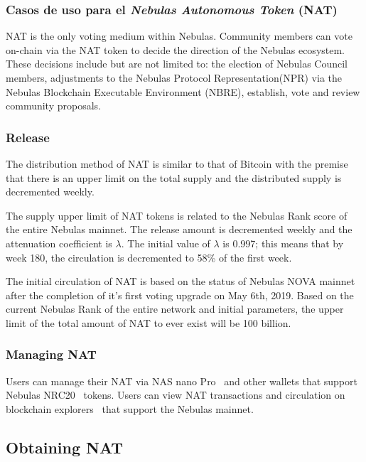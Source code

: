 \subsubsection{Casos de uso para el \textit{Nebulas Autonomous Token} (NAT)}

NAT is the only voting medium within Nebulas. Community members can vote on-chain via the NAT token to decide the direction of the Nebulas ecosystem. These decisions include but are not limited to: the election of Nebulas Council members, adjustments to the Nebulas Protocol Representation(NPR) via the Nebulas Blockchain Executable Environment (NBRE), establish, vote and review community proposals.

\subsubsection{Release}

The distribution method of NAT is similar to that of Bitcoin with the premise that there is an upper limit on the total supply and the distributed supply is decremented weekly.

The supply upper limit of NAT tokens is related to the Nebulas Rank score of
the entire Nebulas mainnet. The release amount is decremented weekly and the
attenuation coefficient is $\lambda$. The initial value of $\lambda$ is 0.997; this means that by week 180, the circulation is decremented to 58\% of the first week.

The initial circulation of NAT is based on the status of Nebulas NOVA mainnet after the completion of it's first voting upgrade on May 6th, 2019. Based on the current Nebulas Rank of the entire network and initial parameters, the upper limit of the total amount of NAT to ever exist will be 100 billion.

\subsubsection{Managing NAT}

Users can manage their NAT via NAS nano Pro~\cite{NASnano} and other wallets that support Nebulas NRC20~\cite{wallets} tokens. Users can view NAT transactions and circulation on blockchain explorers~\cite{explorer} that support the Nebulas mainnet.

\subsection{Obtaining NAT}

